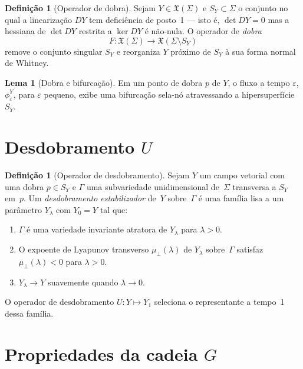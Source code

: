 \documentclass[12pt,a4paper,twoside]{book}
\theoremstyle{plain}
\theoremstyle{definition}
\newtheorem{lema}[teorema]{Lema}
\theoremstyle{definition}
\newtheorem{definicao}[teorema]{Definição}
\newcommand{\eps}{\varepsilon}
\begin{document}
\begin{definicao}[Operador de dobra]\label{def:op-F}
Sejam $Y \in \mathfrak{X}(\Sigma)$ e $S_{Y} \subset \Sigma$ o conjunto
no qual a linearização $DY$ tem deficiência de posto~1 --- isto é,
$\det DY = 0$ mas a hessiana de $\det DY$ restrita a $\ker DY$ é não-nula.
O operador de \emph{dobra}
\[
  F : \mathfrak{X}(\Sigma) \to \mathfrak{X}(\Sigma \setminus S_{Y})
\]
remove o conjunto singular $S_{Y}$ e reorganiza $Y$ próximo de $S_{Y}$
à sua forma normal de Whitney.
\end{definicao}

\begin{lema}[Dobra e bifurcação]\label{lem:F-bifur}
Em um ponto de dobra $p$ de $Y$, o fluxo a tempo $\eps$, $\phi_{\eps}^{Y}$,
para $\eps$ pequeno, exibe uma bifurcação sela-nó atravessando a
hipersuperfície $S_{Y}$.
\end{lema}

\section{Desdobramento $U$}
\label{sec:operador-U}

\begin{definicao}[Operador de desdobramento]\label{def:op-U}
Sejam $Y$ um campo vetorial com uma dobra $p \in S_{Y}$ e $\Gamma$ uma
subvariedade unidimensional de~$\Sigma$ transversa a $S_{Y}$ em~$p$.
Um \emph{desdobramento estabilizador} de~$Y$ sobre~$\Gamma$ é uma família
lisa a um parâmetro $Y_{\lambda}$ com $Y_{0} = Y$ tal que:
\begin{enumerate}[label=\textup{(U\arabic*)}]
  \item $\Gamma$ é uma variedade invariante atratora de $Y_{\lambda}$
        para $\lambda > 0$.
  \item O expoente de Lyapunov transverso $\mu_{\perp}(\lambda)$ de
        $Y_{\lambda}$ sobre~$\Gamma$ satisfaz $\mu_{\perp}(\lambda) < 0$
        para $\lambda > 0$.
  \item $Y_{\lambda} \to Y$ suavemente quando $\lambda \to 0$.
\end{enumerate}
O operador de desdobramento $U : Y \mapsto Y_{1}$ seleciona o representante
a tempo~1 dessa família.
\end{definicao}

\section{Propriedades da cadeia $G$}
\end{document}
